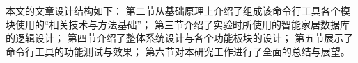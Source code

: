 \begin{CJK*}{UTF8}{song}

本文的文章设计结构如下：
第二节从基础原理上介绍了组成该命令行工具各个模块使用的“相关技术与方法基础”；
第三节介绍了实验时所使用的智能家居数据库的逻辑设计；
第四节介绍了整体系统设计与各个功能板块的设计；
第五节展示了命令行工具的功能测试与效果；
第六节对本研究工作进行了全面的总结与展望。

\end{CJK*}